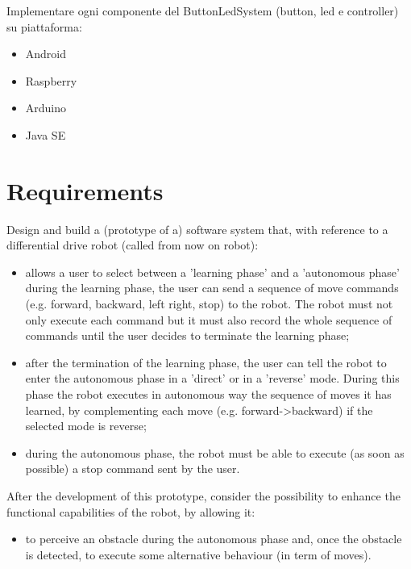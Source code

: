 \documentclass{llncs}
\newcommand{\labelsec}[1]{\label{sec:#1}}
\begin{document}
Implementare ogni componente del ButtonLedSystem (button, led e controller) su piattaforma:
\begin{itemize}
	\item Android
	\item Raspberry
	\item Arduino
	\item Java SE
\end{itemize}
\labelsec{Goals}

\section{Requirements}
\labelsec{Requirements}
Design and build a (prototype of a) software system that, with reference to a differential drive robot (called from now on robot):
\begin{itemize}
	\item allows a user to select between a 'learning phase' and a 'autonomous phase'
    during the learning phase, the user can send a sequence of move commands (e.g. forward, backward, left right, stop) to the robot. The robot must not only execute each command but it must also record the whole sequence of commands until the user decides to terminate the learning phase;
    \item after the termination of the learning phase, the user can tell the robot to enter the autonomous phase in a 'direct' or in a 'reverse' mode. During this phase the robot executes in autonomous way the sequence of moves it has learned, by complementing each move (e.g. forward->backward) if the selected mode is reverse;
    \item during the autonomous phase, the robot must be able to execute (as soon as possible) a stop command sent by the user.
\end{itemize}
After the development of this prototype, consider the possibility to enhance the functional capabilities of the robot, by allowing it:
\begin{itemize}
	\item to perceive an obstacle during the autonomous phase and, once the obstacle is detected, to execute some alternative behaviour (in term of moves).
\end{itemize}

\end{document}
